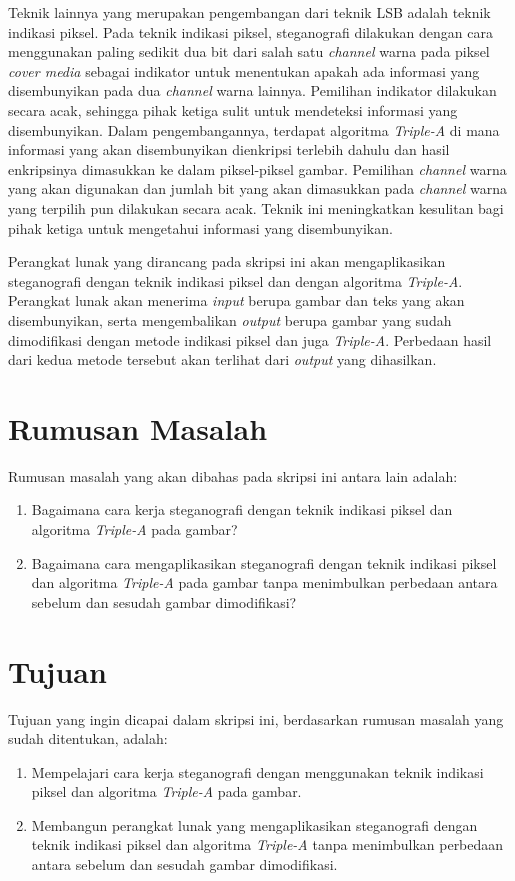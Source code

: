 \documentclass[a4paper,twoside]{article}
\begin{document}
Teknik lainnya yang merupakan pengembangan dari teknik LSB adalah teknik indikasi piksel. Pada teknik indikasi piksel, steganografi dilakukan dengan cara menggunakan paling sedikit dua bit dari salah satu \textit{channel} warna pada piksel \textit{cover media} sebagai indikator untuk menentukan apakah ada informasi yang disembunyikan pada dua \textit{channel} warna lainnya. Pemilihan indikator dilakukan secara acak, sehingga pihak ketiga sulit untuk mendeteksi informasi yang disembunyikan. Dalam pengembangannya, terdapat algoritma \textit{Triple-A} di mana informasi yang akan disembunyikan dienkripsi terlebih dahulu dan hasil enkripsinya dimasukkan ke dalam piksel-piksel gambar. Pemilihan \textit{channel} warna yang akan digunakan dan jumlah bit yang akan dimasukkan pada \textit{channel} warna yang terpilih pun dilakukan secara acak. Teknik ini meningkatkan kesulitan bagi pihak ketiga untuk mengetahui informasi yang disembunyikan.

Perangkat lunak yang dirancang pada skripsi ini akan mengaplikasikan steganografi dengan teknik indikasi piksel dan dengan algoritma \textit{Triple-A}. Perangkat lunak akan menerima \textit{input} berupa gambar dan teks yang akan disembunyikan, serta mengembalikan \textit{output} berupa gambar yang sudah dimodifikasi dengan metode indikasi piksel dan juga \textit{Triple-A}. Perbedaan hasil dari kedua metode tersebut akan terlihat dari \textit{output} yang dihasilkan.

\section{Rumusan Masalah}
Rumusan masalah yang akan dibahas pada skripsi ini antara lain adalah:
\begin{enumerate}
	\item Bagaimana cara kerja steganografi dengan teknik indikasi piksel dan algoritma \textit{Triple-A} pada gambar?
	\item Bagaimana cara mengaplikasikan steganografi dengan teknik indikasi piksel dan algoritma \textit{Triple-A} pada gambar tanpa menimbulkan perbedaan antara sebelum dan sesudah gambar dimodifikasi?
\end{enumerate}

\section{Tujuan}
Tujuan yang ingin dicapai dalam skripsi ini, berdasarkan rumusan masalah yang sudah ditentukan, adalah:
\begin{enumerate}
	\item Mempelajari cara kerja steganografi dengan menggunakan teknik indikasi piksel dan algoritma \textit{Triple-A} pada gambar.
	\item Membangun perangkat lunak yang mengaplikasikan steganografi dengan teknik indikasi piksel dan algoritma \textit{Triple-A} tanpa menimbulkan perbedaan antara sebelum dan sesudah gambar dimodifikasi.
\end{enumerate}
\end{document}

